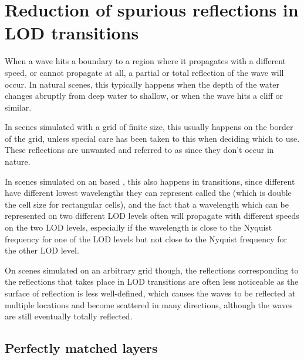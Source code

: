 

\section{Reduction of spurious reflections in LOD transitions}

When a wave hits a boundary to a region where it propagates with a different speed, or cannot propagate at all, a partial or total reflection of the wave will occur. In natural scenes, this typically happens when the depth of the water changes abruptly from deep water to shallow, or when the wave hits a cliff or similar.

In scenes simulated with a grid of finite size, this usually happens on the border of the grid, unless special care has been taken to this when deciding which  to use. These reflections are unwanted and referred to as  since they don't occur in nature.

In scenes simulated on an \octree based \grid, this also happens in \LOD transitions, since different  have different lowest wavelengths they can represent called the  (which is double the cell size for rectangular cells), and the fact that a wavelength which can be represented on two different LOD levels often will propagate with different speeds on the two LOD levels, especially if the wavelength is close to the Nyquist frequency for one of the LOD levels but not close to the Nyquist frequency for the other LOD level.

On scenes simulated on an arbitrary grid though, the reflections corresponding to the reflections that takes place in LOD transitions are often less noticeable as the surface of reflection is less well-defined, which causes the waves to be reflected at multiple locations and become scattered in many directions, although the waves are still eventually totally reflected.

\subsection{Perfectly matched layers}

